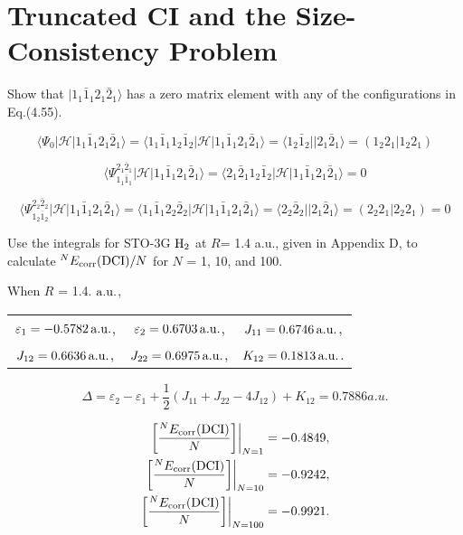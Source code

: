 \documentclass[a4paper]{book}
\newcommand{\corr}{{\rm corr}}
\newcommand{\au}{{\rm a.u.}}
\begin{document}
	\section{Truncated CI and the Size-Consistency Problem}	
	
	\begin{exercise}
	Show that $|1_1 \bar{1}_1 2_1 \bar{2}_1 \rangle$ has a zero matrix element with any of the configurations in Eq.(4.55).
	\end{exercise}
	
	\begin{solution}
	
	\[
		\langle \Psi_0 | \mathscr{H} | 1_1 \bar{1}_1 2_1 \bar{2}_1 \rangle = \langle 1_1 \bar{1}_1 1_2 \bar{1}_2 | \mathscr{H} | 1_1 \bar{1}_1 2_1 \bar{2}_1 \rangle = \langle 1_2 \bar{1}_2 || 2_1 \bar{2}_1 \rangle = ( 1_2 2_1 | 1_2 2_1 )
	\]
	
	\[
		\langle \Psi^{2_1 \bar{2}_1}_{1_1 \bar{1}_1} | \mathscr{H} | 1_1 \bar{1}_1 2_1 \bar{2}_1 \rangle = \langle 2_1 \bar{2}_1 1_2 \bar{1}_2 | \mathscr{H} | 1_1 \bar{1}_1 2_1 \bar{2}_1 \rangle = 0
	\]
	
	\[
		\langle \Psi^{2_2 \bar{2}_2}_{1_2 \bar{1}_2} | \mathscr{H} | 1_1 \bar{1}_1 2_1 \bar{2}_1 \rangle = \langle 1_1 \bar{1}_1 2_2 \bar{2}_2 | \mathscr{H} | 1_1 \bar{1}_1 2_1 \bar{2}_1 \rangle = \langle 2_2 \bar{2}_2 || 2_1 \bar{2}_1 \rangle = ( 2_2 2_1 | 2_2 2_1 ) = 0
	\]
	
	\end{solution}
	
	\begin{exercise}
	Use the integrals for STO-3G $\ce{H2}$ at $R$= 1.4 a.u., given in Appendix D, to calculate ${}^{N}E_\corr({\rm DCI})/N$ for $N$ = 1, 10, and 100.
	\end{exercise}
	
	\begin{solution}
	
	When $R$ = 1.4. $\au$, 
	\begin{center}
	\begin{tabular}{ccc}
		$\varepsilon_1 = -0.5782\,\au$, & $\varepsilon_2 = 0.6703\, \au$, & $J_{11} = 0.6746\,\au$, \\
		$J_{12} = 0.6636\,\au$, & $J_{22} = 0.6975\,\au$, & $K_{12} = 0.1813\,\au$.
	\end{tabular}	
	\end{center}
	\[
		\Delta = \varepsilon_2 - \varepsilon_1 + \frac{1}{2} \left( J_{11} + J_{22} - 4 J_{12} \right) + K_{12} = 0.7886 a.u.
	\]

	\begin{align}
		\left. \left[ \frac{^N E_\corr({\rm DCI})}{N} \right] \right|_{ N=1 } &= -0.4849, \\
		\left. \left[ \frac{^N E_\corr({\rm DCI})}{N} \right] \right|_{ N=10 } &= -0.9242, \\
		\left. \left[ \frac{^N E_\corr({\rm DCI})}{N} \right] \right|_{ N=100 } &= -0.9921.
	\end{align}
	
	\end{solution}
	
\end{document}
